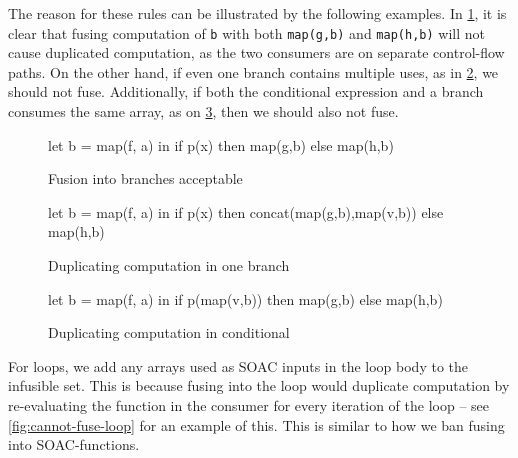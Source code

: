 \begin{description}[style=nextline]
The reason for these rules can be illustrated by the following
examples.  In \cref{fig:fuse-across-if-ok}, it is clear that fusing
computation of \texttt{b} with both \texttt{map(g,b)} and
\texttt{map(h,b)} will not cause duplicated computation, as the two
consumers are on separate control-flow paths.  On the other hand, if
even one branch contains multiple uses, as in
\cref{fig:fuse-across-if-bad}, we should not fuse.  Additionally, if
both the conditional expression and a branch consumes the same array,
as on \cref{fig:fuse-across-if-bad-condition}, then we should also not
fuse.

\begin{figure}
\begin{center}
\begin{bcolorcode}
let b = map(f, a) in
if p(x) then map(g,b)
        else map(h,b)
\end{bcolorcode}
\end{center}
\caption{Fusion into branches acceptable}
\label{fig:fuse-across-if-ok}
\end{figure}

\begin{figure}
\begin{center}
\begin{bcolorcode}
let b = map(f, a) in
if p(x) then concat(map(g,b),map(v,b))
        else map(h,b)
\end{bcolorcode}
\end{center}
\caption{Duplicating computation in one branch}
\label{fig:fuse-across-if-bad}
\end{figure}

\begin{figure}
\begin{center}
\begin{bcolorcode}
let b = map(f, a) in
if p(map(v,b)) then map(g,b)
               else map(h,b)
\end{bcolorcode}
\end{center}
\caption{Duplicating computation in conditional}
\label{fig:fuse-across-if-bad-condition}
\end{figure}

\item[Case $e \equiv \texttt{loop ($p$ = $e_{1}$) = for $v$ < $e_{2}$ do $e_{3}$ in $e_{4}$}$]

  For loops, we add any arrays used as SOAC inputs in the loop body to
  the infusible set.  This is because fusing into the loop would
  duplicate computation by re-evaluating the function in the consumer
  for every iteration of the loop -- see \cref{fig:cannot-fuse-loop}
  for an example of this.  This is similar to how we ban fusing into
  SOAC-functions.


\end{description}
